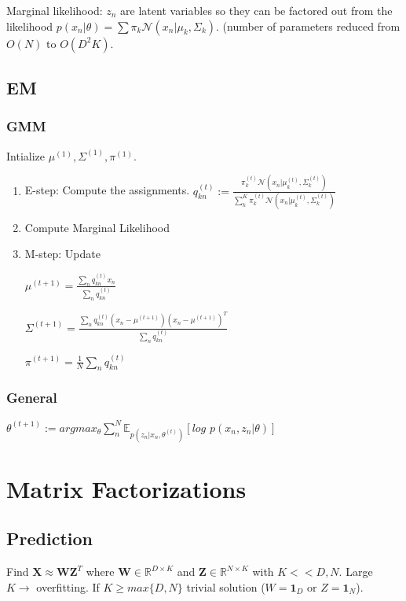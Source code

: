 Marginal likelihood: $z_n$ are latent variables so they can be factored out from the likelihood $p(x_n|\theta) = \sum \pi_k \mathcal{N}(x_n|\mu_k, \Sigma_k)$. (number of parameters reduced from $O(N)$ to $O(D^2K)$.

\subsection{EM}
\subsubsection{GMM}
Intialize $\mu^{(1)}, \Sigma^{(1)}, \pi^{(1)}$.
\begin{enumerate}
\item E-step: Compute the assignments. $q_{kn}^{(t)} := \frac{\pi_k^{(t)} \mathcal{N}(x_n|\mu_k^{(t)}, \Sigma_k^{(t)})}{ \sum_k^K \pi_k^{(t)} \mathcal{N}(x_n|\mu_k^{(t)}, \Sigma_k^{(t)}) }$
\item Compute Marginal Likelihood
\item M-step: Update

$\mu^{(t+1)} = \frac{\sum_n q_{kn}^{(t)} x_n}{\sum_n q_{kn}^{(t)}}$

$\Sigma^{(t+1)} = \frac{\sum_n q_{kn}^{(t)}(x_n - \mu^{(t+1)})(x_n - \mu^{(t+1)})^T}{\sum_n q_{kn}^{(t)}}$

$\pi^{(t+1)} = \frac{1}{N} \sum_n q_{kn}^{(t)}$
\end{enumerate}

\subsubsection{General}
$\theta^{(t+1)} := argmax_{\theta} \sum_n^N \mathbb{E}_{p(z_n|x_n,\theta^{(t)})}[log\,\, p(x_n,z_n|\theta)]$

\section{Matrix Factorizations}
\subsection{Prediction}
Find $\mathbf{X} \approx \mathbf{W}\mathbf{Z}^T$ where $\mathbf{W} \in \mathbb{R}^{D\times K}$ and $\mathbf{Z} \in \mathbb{R}^{N\times K}$ with $K << D,N$. Large $K\rightarrow$ overfitting. If $K \ge max\{D,N\}$ trivial solution ($W=\mathbf{1}_D$ or $Z=\mathbf{1}_N$).

